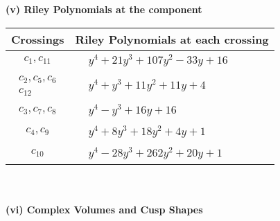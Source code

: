\documentclass[1p]{elsarticle_modified}
\theoremstyle{definition}
\begin{document}
\newpage\renewcommand{\arraystretch}{1}
\flushleft \textbf{(v) Riley Polynomials at the component}\newline \\
\begin{tabular}{m{50pt}|m{274pt}}
Crossings & \hspace{64pt}Riley Polynomials at each crossing \\
\hline $$\begin{aligned}c_{1},c_{11}\end{aligned}$$&$\begin{aligned}
&y^4+21 y^3+107 y^2-33 y+16
\end{aligned}$\\
\hline $$\begin{aligned}c_{2},c_{5},c_{6}\\c_{12}\end{aligned}$$&$\begin{aligned}
&y^4+y^3+11 y^2+11 y+4
\end{aligned}$\\
\hline $$\begin{aligned}c_{3},c_{7},c_{8}\end{aligned}$$&$\begin{aligned}
&y^4- y^3+16 y+16
\end{aligned}$\\
\hline $$\begin{aligned}c_{4},c_{9}\end{aligned}$$&$\begin{aligned}
&y^4+8 y^3+18 y^2+4 y+1
\end{aligned}$\\
\hline $$\begin{aligned}c_{10}\end{aligned}$$&$\begin{aligned}
&y^4-28 y^3+262 y^2+20 y+1
\end{aligned}$\\
\hline
\end{tabular}\\~\\
\newpage\flushleft \textbf{(vi) Complex Volumes and Cusp Shapes}
\end{document}
